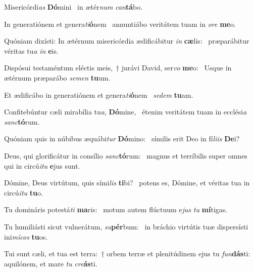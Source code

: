 \item Misericórdi\textit{as} \textbf{Dó}mini~\psstar{} in ætér\textit{num} \textit{can}\textbf{tá}bo.

\item In generatiónem et genera\textit{ti}\textbf{ó}nem~\psstar{} annuntiábo veritátem tuam in \textit{ore} \textbf{me}o.

\item Quóniam dixísti: In ætérnum misericórdia ædificábitur \textit{in} \textbf{cæ}lis:~\psstar{} præparábitur véritas tu\textit{a} \textit{in} \textbf{e}is.

\item Dispósui testaméntum eléctis meis,~† jurávi David, ser\textit{vo} \textbf{me}o:~\psstar{} Usque in ætérnum præparábo \textit{semen} \textbf{tu}um.

\item Et ædificábo in generatiónem et genera\textit{ti}\textbf{ó}nem~\psstar{} \textit{sedem} \textbf{tu}am.

\item Confitebúntur cæli mirabília tu\textit{a}, \textbf{Dó}mine,~\psstar{} étenim veritátem tuam in ecclési\textit{a} \textit{sanc}\textbf{tó}rum.

\item Quóniam quis in núbibus æquábi\textit{tur} \textbf{Dó}mino:~\psstar{} símilis erit Deo in fí\textit{liis} \textbf{De}i?

\item Deus, qui glorificátur in consílio \textit{sanc}\textbf{tó}rum:~\psstar{} magnus et terríbilis super omnes qui in circú\textit{itu} \textbf{e}jus sunt.

\item Dómine, Deus virtútum, quis sími\textit{lis} \textbf{ti}bi?~\psstar{} potens es, Dómine, et véritas tua in circú\textit{itu} \textbf{tu}o.

\item Tu domináris potestá\textit{ti} \textbf{ma}ris:~\psstar{} motum autem flúctuum e\textit{jus} \textit{tu} \textbf{mí}tigas.

\item Tu humiliásti sicut vulnerátum, \textit{su}\textbf{pér}bum:~\psstar{} in bráchio virtútis tuæ dispersísti ini\textit{mícos} \textbf{tu}os.

\item Tui sunt cæli, et tua est terra:~† orbem terræ et plenitúdinem ejus tu \textit{fun}\textbf{dás}ti:~\psstar{} aquilónem, et mare \textit{tu} \textit{cre}\textbf{ás}ti.

